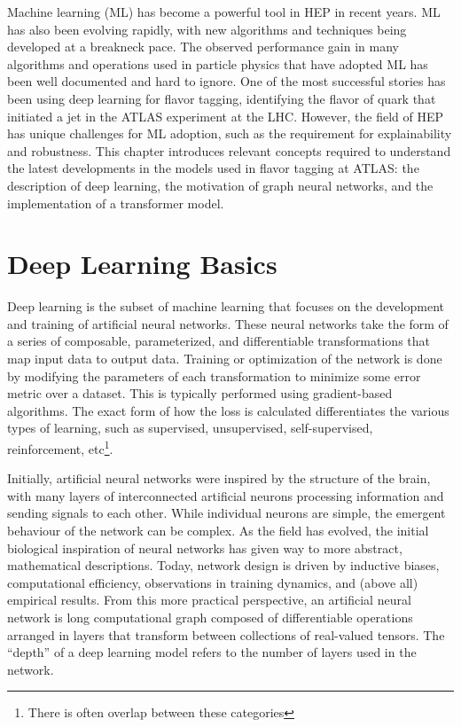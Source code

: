 Machine learning (ML) has become a powerful tool in HEP in recent years.
ML has also been evolving rapidly, with new algorithms and techniques being developed at a breakneck pace.
The observed performance gain in many algorithms and operations used in particle physics that have adopted ML has been well documented and hard to ignore.
One of the most successful stories has been using deep learning for flavor tagging, identifying the flavor of quark that initiated a jet in the ATLAS experiment at the LHC.
However, the field of HEP has unique challenges for ML adoption, such as the requirement for explainability and robustness.
This chapter introduces relevant concepts required to understand the latest developments in the models used in flavor tagging at ATLAS: the description of deep learning, the motivation of graph neural networks, and the implementation of a transformer model.

\chapter{Deep Learning Basics}

Deep learning is the subset of machine learning that focuses on the development and training of artificial neural networks.
These neural networks take the form of a series of composable, parameterized, and differentiable transformations that map input data to output data.
Training or optimization of the network is done by modifying the parameters of each transformation to minimize some error metric over a dataset.
This is typically performed using gradient-based algorithms.
The exact form of how the loss is calculated differentiates the various types of learning, such as supervised, unsupervised, self-supervised, reinforcement, etc\footnote{There is often overlap between these categories}.

Initially, artificial neural networks were inspired by the structure of the brain, with many layers of interconnected artificial neurons processing information and sending signals to each other.
While individual neurons are simple, the emergent behaviour of the network can be complex.
As the field has evolved, the initial biological inspiration of neural networks has given way to more abstract, mathematical descriptions.
Today, network design is driven by inductive biases, computational efficiency, observations in training dynamics, and (above all) empirical results.
From this more practical perspective, an artificial neural network is long computational graph composed of differentiable operations arranged in layers that transform between collections of real-valued tensors.
The ``depth'' of a deep learning model refers to the number of layers used in the network.

